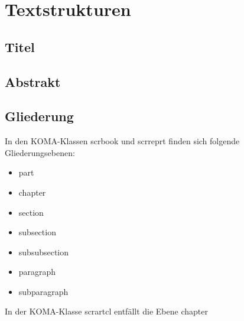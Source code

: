 \chapter{Textstrukturen}

\section{Titel}
\label{sec:Titel}

\section{Abstrakt}
\label{sec:Abstrakt}
\begin{verbatim*} 
	\begin{abstract}
...
	\end{abstract}
\end{verbatim*} %

\section{Gliederung}
\label{sec:gliederung}

In den KOMA-Klassen scrbook und scrreprt finden sich folgende Gliederungsebenen:
\begin{itemize}
	\item part
	\item chapter
	\item section
	\item subsection
	\item subsubsection
	\item paragraph
	\item subparagraph

\end{itemize}

In der KOMA-Klasse scrartcl entfällt die Ebene chapter